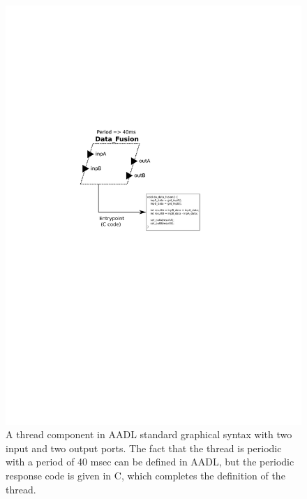 \begin{figure}
\centering
\includegraphics[scale=0.6]{figs/comp_code}
\caption[Thread component in AADL, showing features and properties.]{A
  thread component in AADL standard graphical syntax with two input
  and two output ports. The fact that the thread is periodic with a
  period of 40 msec can be defined in AADL, but the periodic response
  code is given in C, which completes the definition of the thread.}
\label{fig:comp_code}
\end{figure}


